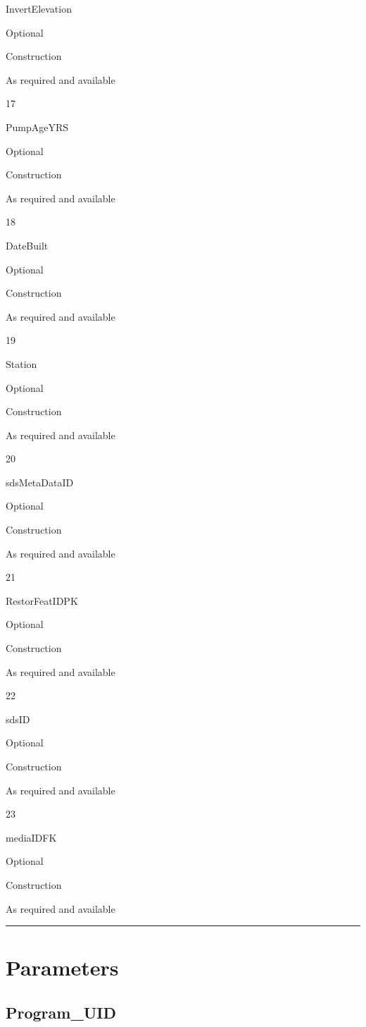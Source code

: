\documentclass[
  letterpaper,
  DIV=11,
  numbers=noendperiod]{scrreprt}
\begin{document}
InvertElevation

Optional

Construction

As required and available

17

PumpAgeYRS

Optional

Construction

As required and available

18

DateBuilt

Optional

Construction

As required and available

19

Station

Optional

Construction

As required and available

20

sdsMetaDataID

Optional

Construction

As required and available

21

RestorFeatIDPK

Optional

Construction

As required and available

22

sdsID

Optional

Construction

As required and available

23

mediaIDFK

Optional

Construction

As required and available

\begin{center}\rule{0.5\linewidth}{0.5pt}\end{center}

\section{Parameters}\label{parameters-6}

\subsection{Program\_UID}\label{program_uid-6}
\end{document}
